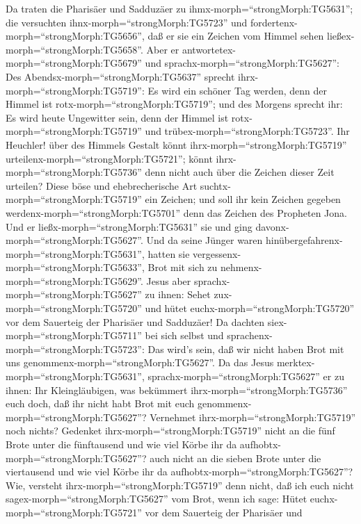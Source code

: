  Da traten die Pharisäer und Sadduzäer zu
ihmx-morph=``strongMorph:TG5631''; die versuchten
ihnx-morph=``strongMorph:TG5723'' und
fordertenx-morph=``strongMorph:TG5656'', daß er sie ein Zeichen vom
Himmel sehen ließex-morph=``strongMorph:TG5658''.  Aber er
antwortetex-morph=``strongMorph:TG5679'' und
sprachx-morph=``strongMorph:TG5627'': Des
Abendsx-morph=``strongMorph:TG5637'' sprecht
ihrx-morph=``strongMorph:TG5719'': Es wird ein schöner Tag werden, denn
der Himmel ist rotx-morph=``strongMorph:TG5719'';  und des
Morgens sprecht ihr: Es wird heute Ungewitter sein, denn der Himmel ist
rotx-morph=``strongMorph:TG5719'' und
trübex-morph=``strongMorph:TG5723''. Ihr Heuchler! über des Himmels
Gestalt könnt ihrx-morph=``strongMorph:TG5719''
urteilenx-morph=``strongMorph:TG5721''; könnt
ihrx-morph=``strongMorph:TG5736'' denn nicht auch über die Zeichen
dieser Zeit urteilen?  Diese böse und ehebrecherische Art
suchtx-morph=``strongMorph:TG5719'' ein Zeichen; und soll ihr kein
Zeichen gegeben werdenx-morph=``strongMorph:TG5701'' denn das Zeichen
des Propheten Jona. Und er ließx-morph=``strongMorph:TG5631'' sie und
ging davonx-morph=``strongMorph:TG5627''.  Und da seine
Jünger waren hinübergefahrenx-morph=``strongMorph:TG5631'', hatten sie
vergessenx-morph=``strongMorph:TG5633'', Brot mit sich zu
nehmenx-morph=``strongMorph:TG5629''.  Jesus aber
sprachx-morph=``strongMorph:TG5627'' zu ihnen: Sehet
zux-morph=``strongMorph:TG5720'' und hütet
euchx-morph=``strongMorph:TG5720'' vor dem Sauerteig der Pharisäer und
Sadduzäer!  Da dachten siex-morph=``strongMorph:TG5711'' bei
sich selbst und sprachenx-morph=``strongMorph:TG5723'': Das wird's sein,
daß wir nicht haben Brot mit uns genommenx-morph=``strongMorph:TG5627''.
 Da das Jesus merktex-morph=``strongMorph:TG5631'',
sprachx-morph=``strongMorph:TG5627'' er zu ihnen: Ihr Kleingläubigen,
was bekümmert ihrx-morph=``strongMorph:TG5736'' euch doch, daß ihr nicht
habt Brot mit euch genommenx-morph=``strongMorph:TG5627''? 
Vernehmet ihrx-morph=``strongMorph:TG5719'' noch nichts? Gedenket
ihrx-morph=``strongMorph:TG5719'' nicht an die fünf Brote unter die
fünftausend und wie viel Körbe ihr da
aufhobtx-morph=``strongMorph:TG5627''?  auch nicht an die
sieben Brote unter die viertausend und wie viel Körbe ihr da
aufhobtx-morph=``strongMorph:TG5627''?  Wie, versteht
ihrx-morph=``strongMorph:TG5719'' denn nicht, daß ich euch nicht
sagex-morph=``strongMorph:TG5627'' vom Brot, wenn ich sage: Hütet
euchx-morph=``strongMorph:TG5721'' vor dem Sauerteig der Pharisäer und
